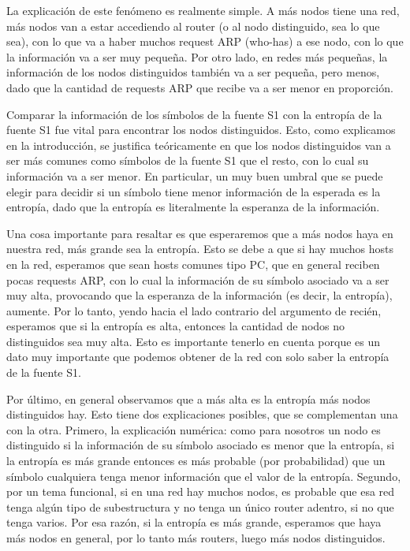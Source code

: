 La explicación de este fenómeno es realmente simple. A más nodos tiene una red, más nodos van a estar accediendo al router (o al nodo distinguido, sea lo que sea), con lo que va a haber muchos request ARP (who-has) a ese nodo, con lo que la información va a ser muy pequeña. Por otro lado, en redes más pequeñas, la información de los nodos distinguidos también va a ser pequeña, pero menos, dado que la cantidad de requests ARP que recibe va a ser menor en proporción.


Comparar la información de los símbolos de la fuente S1 con la entropía de la fuente S1 fue vital para encontrar los nodos distinguidos. Esto, como explicamos en la introducción, se justifica teóricamente en que los nodos distinguidos van a ser más comunes como símbolos de la fuente S1 que el resto, con lo cual su información va a ser menor. En particular, un muy buen umbral que se puede elegir para decidir si un símbolo tiene menor información de la esperada es la entropía, dado
que la entropía es literalmente la esperanza de la información.

Una cosa importante para resaltar es que esperaremos que a más nodos haya en nuestra red, más grande sea la entropía. Esto se debe a que si hay muchos hosts en la red, esperamos que sean hosts comunes tipo PC, que en general reciben pocas requests ARP, con lo cual la información de su símbolo asociado va a ser muy alta, provocando que la esperanza de la información (es decir, la entropía), aumente. Por lo tanto, yendo hacia el lado contrario del argumento de recién, esperamos que
si la entropía es alta, entonces la cantidad de nodos no distinguidos sea muy alta.
Esto es importante tenerlo en cuenta porque es un dato muy importante que podemos obtener de la red con solo saber la entropía de la fuente S1.

Por último, en general observamos que a más alta es la entropía más nodos distinguidos hay. Esto tiene dos explicaciones posibles, que se complementan una con la otra.
Primero, la explicación numérica: como para nosotros un nodo es distinguido si la información de su símbolo asociado es menor que la entropía, si la entropía es más grande entonces es más probable (por probabilidad) que un símbolo cualquiera tenga menor información que el valor de la entropía.
Segundo, por un tema funcional, si en una red hay muchos nodos, es probable que esa red tenga algún tipo de subestructura y no tenga un único router adentro, si no que tenga varios. Por esa razón, si la entropía es más grande, esperamos que haya más nodos en general, por lo tanto más routers, luego más nodos distinguidos.



